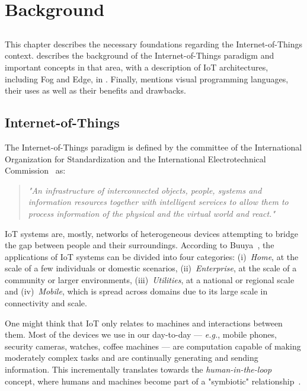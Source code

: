 \chapter{Background} \label{chap:background}

\section*{}

\minitoc \mtcskip \noindent
This chapter describes the necessary foundations regarding the Internet-of-Things context.  describes the background of the Internet-of-Things paradigm and important concepts in that area, with a description of IoT architectures, including Fog and Edge, in . Finally,  mentions visual programming languages, their uses as well as their benefits and drawbacks.

\section{Internet-of-Things}\label{sec:background_iot}

The Internet-of-Things paradigm is defined by the committee of the International Organization for Standardization and the International Electrotechnical Commission~\cite{ISOIEC} as:

\begin{quote}
    \emph{"An infrastructure of interconnected objects, people, systems and information resources together with intelligent services to allow them to process information of the physical and the virtual world and react."}
\end{quote}

\noindent
IoT systems are, mostly, networks of heterogeneous devices attempting to bridge the gap between people and their surroundings. According to Buuya~\cite{iot_future_direction}, the applications of IoT systems can be divided into four categories: (i)~\textit{Home}, at the scale of a few individuals or domestic scenarios, (ii)~\textit{Enterprise}, at the scale of a community or larger environments, (iii)~\textit{Utilities}, at a national or regional scale and (iv)~\textit{Mobile}, which is spread across domains due to its large scale in connectivity and scale. 

One might think that IoT only relates to machines and interactions between them. Most of the devices we use in our day-to-day --- \emph{e.g.}, mobile phones, security cameras, watches, coffee machines --- are computation capable of making moderately complex tasks and are continually generating and sending information. This incrementally translates towards the \emph{human-in-the-loop} concept, where humans and machines become part of a "symbiotic" relationship~\cite{human_in_the_loop_survey}.
 

